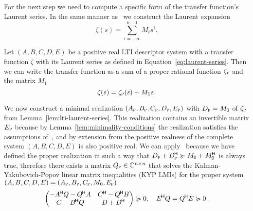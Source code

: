 For the next step we need to compute a specific form of the transfer function's Laurent series.
In the same manner as~\cite[Equation~(37)]{CGH2022} we construct the Laurent expansion
\begin{equation}\label{eq:laurent-series}
    \zeta(s) = \sum\limits_{i = -\infty}^{k - 1} M_i s^i.
\end{equation}


\begin{lemma}\label{lem:lti-laurent-series}
    Let $(A, B, C, D, E)$ be a positive real LTI descriptor system with a transfer function $\zeta$ with its Laurent series as defined in Equation~\eqref{eq:laurent-series}.
    Then we can write the transfer function as a sum of a proper rational function $\zeta_{\textnormal{\scshape p}}$ and the matrix $M_1$
    \begin{equation}\label{eq:pr-lti-laurent-series}
        \zeta(s) = \zeta_{\textnormal{\scshape p}}(s) + M_1 s.
    \end{equation}
\end{lemma}

We now construct a minimal realization $(A_{\textnormal{\scshape p}}, B_{\textnormal{\scshape p}}, C_{\textnormal{\scshape p}}, D_{\textnormal{\scshape p}}, E_{\textnormal{\scshape p}})$ with $D_{\textnormal{\scshape p}} = M_0$ of $\zeta_{\textnormal{\scshape p}}$ from Lemma~\ref{lem:lti-laurent-series}.
This realization contains an invertible matrix $E_{\textnormal{\scshape p}}$ because by Lemma~\ref{lem:minimality-conditions} the realization satisfies the assumptions of~\cite[Theorem~6.3]{Freund2004}, and by extension from the positive realness of the complete system $(A, B, C, D, E)$ is also positive real.
We can apply~\cite[Proposition~5.4]{CGH2022} because we have defined the proper realization in such a way that $D_{\textnormal{\scshape p}} + D_{\textnormal{\scshape p}}^{\mkern-1.5mu \mathsf{H}} \succcurlyeq M_0 + M_0^{\mkern-1.5mu \mathsf{H}}$ is always true, therefore there exists a matrix $Q_{\textnormal{\scshape p}} \in \mathbb{C}^{n \times n}$ that solves the Kalman-Yakubovich-Popov linear matrix inequalities (KYP LMIs) for the proper system $(A, B, C, D, E) = (A_{\textnormal{\scshape p}}, B_{\textnormal{\scshape p}}, C_{\textnormal{\scshape p}}, M_0, E_{\textnormal{\scshape p}})$
\begin{equation}\label{eq:kyp-lmi}
    \begin{pmatrix}
        -A^{\mkern-1.5mu \mathsf{H}} Q - Q^{\mkern-1.5mu \mathsf{H}} A & C^{\mkern-1.5mu \mathsf{H}} - Q^{\mkern-1.5mu \mathsf{H}} B \\
        C - B^{\mkern-1.5mu \mathsf{H}} Q & D + D^{\mkern-1.5mu \mathsf{H}}
    \end{pmatrix} \succcurlyeq 0,\quad E^{\mkern-1.5mu \mathsf{H}} Q = Q^{\mkern-1.5mu \mathsf{H}} E \succcurlyeq 0.
\end{equation}

